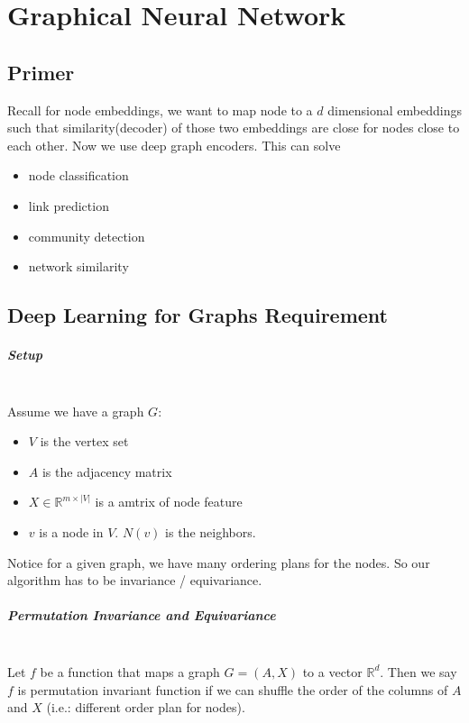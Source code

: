 \chapter{Graphical Neural Network}

\section{Primer}
Recall for node embeddings, we want to map node to a $d$ dimensional embeddings such that similarity(decoder) of those two embeddings are close for nodes close to each other. Now we use deep graph encoders. This can solve 
    \begin{itemize}
        \item node classification 
        \item link prediction 
        \item community detection 
        \item network similarity 
    \end{itemize}
    

\section{Deep Learning for Graphs Requirement}
\paragraph{Setup} \mbox{}\\
Assume we have a graph $G$: 
    \begin{itemize}
        \item $V$ is the vertex set 
        \item $A$ is the adjacency matrix 
        \item $X\in \mathbb{R}^{m \times |V|}$ is a amtrix of node feature 
        \item $v$ is a node in $V$. $N(v)$ is the neighbors. 
    \end{itemize}
Notice for a given graph, we have many ordering plans for the nodes. So our algorithm has to be invariance / equivariance. 

\paragraph{Permutation Invariance and Equivariance} \mbox{}\\
Let $f$ be a function that maps a graph $G=(A,X)$ to a vector $\mathbb{R}^d$. Then we say $f$ is permutation invariant function if we can shuffle the order of the columns of $A$ and $X$ (i.e.: different order plan for nodes). \\

